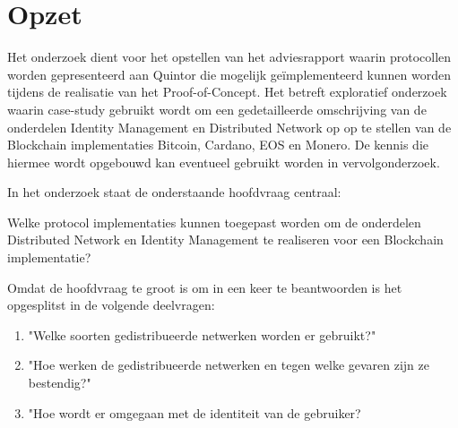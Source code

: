 \newpage
\chapter{Opzet}

Het onderzoek dient voor het opstellen van het adviesrapport waarin protocollen worden  gepresenteerd  aan Quintor die mogelijk geïmplementeerd kunnen worden tijdens de realisatie van het Proof-of-Concept. Het betreft exploratief onderzoek waarin case-study gebruikt wordt om een gedetailleerde omschrijving van de onderdelen Identity Management en Distributed Network op op te stellen van de Blockchain implementaties Bitcoin, Cardano, EOS en Monero. De kennis die hiermee wordt opgebouwd kan eventueel gebruikt worden in vervolgonderzoek.

In het onderzoek staat de onderstaande hoofdvraag centraal:
\begin{formal}
  Welke protocol implementaties kunnen toegepast worden om de onderdelen Distributed Network en Identity Management te realiseren voor een Blockchain implementatie?
\end{formal}

Omdat de hoofdvraag te groot is om in een keer te beantwoorden is het opgesplitst in de volgende deelvragen:

\begin{enumerate}[noitemsep]
  \item "Welke soorten gedistribueerde netwerken worden er gebruikt?"
  \item "Hoe werken de gedistribueerde netwerken en tegen welke gevaren zijn ze bestendig?"
  \item "Hoe wordt er omgegaan met de identiteit van de gebruiker?
\end{enumerate}
